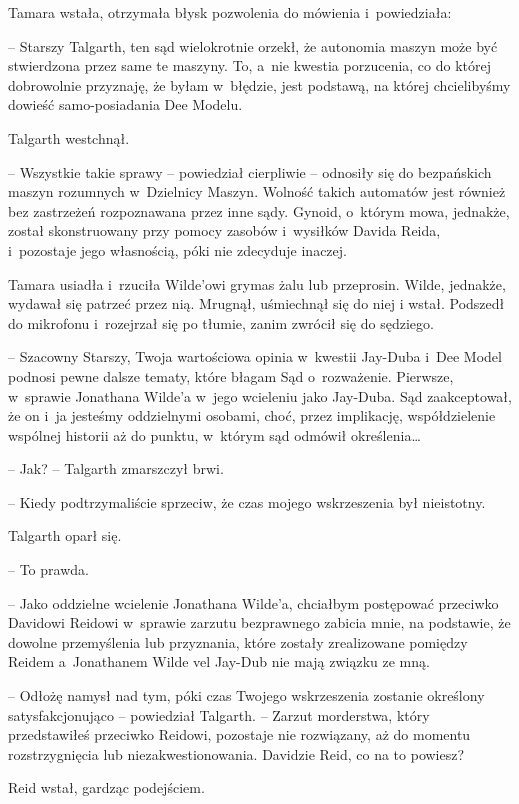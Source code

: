\documentclass[oneside,polish,11pt,sfheadings]{mwbk}
\begin{document}
Tamara wstała, otrzymała błysk pozwolenia do mówienia i~powiedziała: 

-- Starszy Talgarth, ten sąd wielokrotnie orzekł, że autonomia maszyn może
być stwierdzona przez same te maszyny. To, a~nie kwestia porzucenia, co
do której dobrowolnie przyznaję, że byłam w~błędzie, jest podstawą, na
której chcielibyśmy dowieść samo-posiadania Dee Modelu.

Talgarth westchnął. 

-- Wszystkie takie sprawy -- powiedział cierpliwie -- odnosiły się do bezpańskich maszyn rozumnych w~Dzielnicy Maszyn. Wolność
takich automatów jest również bez zastrzeżeń rozpoznawana przez inne
sądy. Gynoid, o~którym mowa, jednakże, został skonstruowany przy pomocy
zasobów i~wysiłków Davida Reida, i~pozostaje jego własnością, póki nie
zdecyduje inaczej.

Tamara usiadła i~rzuciła Wilde'owi grymas żalu lub przeprosin. Wilde,
jednakże, wydawał się patrzeć przez nią. Mrugnął, uśmiechnął się do niej
i wstał. Podszedł do mikrofonu i~rozejrzał się po tłumie, zanim zwrócił
się do sędziego.

-- Szacowny Starszy, Twoja wartościowa opinia w~kwestii Jay-Duba i~Dee
Model podnosi pewne dalsze tematy, które błagam Sąd o~rozważenie.
Pierwsze, w~sprawie Jonathana Wilde'a w~jego wcieleniu jako Jay-Duba.
Sąd zaakceptował, że on i~ja jesteśmy oddzielnymi osobami, choć, przez
implikację, współdzielenie wspólnej historii aż do punktu, w~którym sąd
odmówił określenia\ldots

-- Jak? -- Talgarth zmarszczył brwi.

-- Kiedy podtrzymaliście sprzeciw, że czas mojego wskrzeszenia był
nieistotny.

Talgarth oparł się. 

-- To prawda.

-- Jako oddzielne wcielenie Jonathana Wilde'a, chciałbym postępować
przeciwko Davidowi Reidowi w~sprawie zarzutu bezprawnego zabicia mnie,
na podstawie, że dowolne przemyślenia lub przyznania, które zostały
zrealizowane pomiędzy Reidem a~Jonathanem Wilde vel Jay-Dub nie mają
związku ze mną.

-- Odłożę namysł nad tym, póki czas Twojego wskrzeszenia zostanie
określony satysfakcjonująco -- powiedział Talgarth. -- Zarzut morderstwa,
który przedstawiłeś przeciwko Reidowi, pozostaje nie rozwiązany, aż do
momentu rozstrzygnięcia lub niezakwestionowania. Davidzie Reid, co na to
powiesz?

Reid wstał, gardząc podejściem. 
\end{document}
